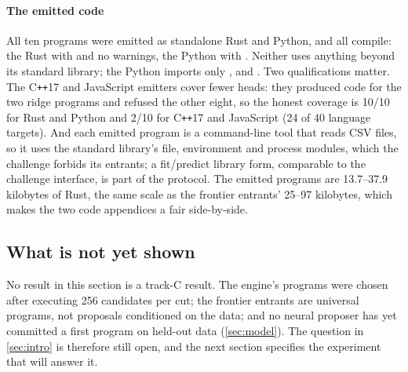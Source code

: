 \paragraph{The emitted code} All ten programs were emitted as standalone Rust and Python, and all
compile: the Rust with  and no warnings, the Python
with  \est. Neither uses anything beyond its standard library; the Python imports
only ,  and . Two qualifications matter. The C\texttt{++}17 and
JavaScript emitters cover fewer heads: they produced code for the two ridge programs and refused the
other eight, so the honest coverage is 10/10 for Rust and Python and 2/10 for C\texttt{++}17 and
JavaScript (24 of 40 language targets). And each emitted program is a command-line tool that reads
CSV files, so it uses the standard library's file, environment and process modules, which the
challenge forbids its entrants; a fit/predict library form, comparable to the challenge interface,
is part of the protocol. The emitted programs are 13.7--37.9 kilobytes of Rust, the same scale as
the frontier entrants' 25--97 kilobytes, which makes the two code appendices a fair side-by-side.

\subsection{What is not yet shown}

No result in this section is a track-C result. The engine's programs were chosen after executing
256 candidates per cut; the frontier entrants are universal programs, not proposals conditioned on
the data; and no neural proposer has yet committed a first program on held-out data
(\cref{sec:model}). The question in \cref{sec:intro} is therefore still open, and the next section
specifies the experiment that will answer it.
